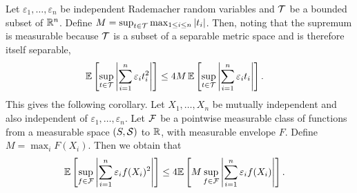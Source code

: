 \begin{lemma}
  \label{lem:contraction}

  Let $\varepsilon_1, \ldots, \varepsilon_n$
  be independent Rademacher random variables
  and $\mathcal{T}$ be a bounded subset of $\mathbb{R}^n$.
  Define
  $M = \sup_{t \in \mathcal{T}} \max_{1 \leq i \leq n} |t_i|$.
  Then, noting that the supremum is measurable
  because $\mathcal{T}$ is a subset of a separable metric space
  and is therefore itself separable,
  \begin{align*}
    \mathbb{E}
    \left[
      \sup_{t \in \mathcal{T}}
      \left|
      \sum_{i=1}^n
      \varepsilon_i
      t_i^2
      \right|
    \right]
    &\leq
    4M \,
    \mathbb{E}
    \left[
      \sup_{t \in \mathcal{T}}
      \left|
      \sum_{i=1}^n
      \varepsilon_i
      t_i
      \right|
    \right].
  \end{align*}
  This gives the following corollary.
  Let $X_1, \ldots, X_n$ be mutually independent
  and also independent of $\varepsilon_1, \ldots, \varepsilon_n$.
  Let $\mathcal{F}$ be a pointwise measurable class of functions
  from a measurable space $(S, \mathcal{S})$ to $\mathbb{R}$,
  with measurable envelope $F$.
  Define $M = \max_i F(X_i)$.
  Then we obtain that
  \begin{align*}
    \mathbb{E}
    \left[
      \sup_{f \in \mathcal{F}}
      \left|
      \sum_{i=1}^n
      \varepsilon_i
      f(X_i)^2
      \right|
    \right]
    &\leq
    4
    \mathbb{E}
    \left[
      M
      \sup_{f \in \mathcal{F}}
      \left|
      \sum_{i=1}^n
      \varepsilon_i
      f(X_i)
      \right|
    \right].
  \end{align*}

\end{lemma}

